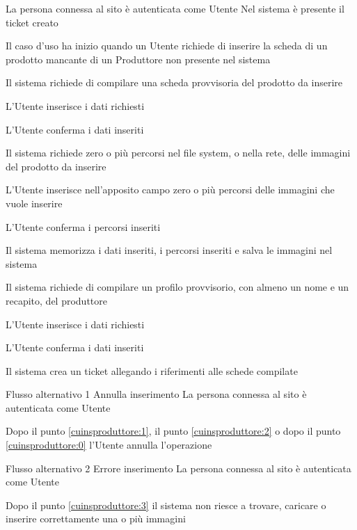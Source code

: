{}
{La persona connessa al sito è autenticata come Utente}
{Nel sistema è presente il ticket creato}
{\begin{enumCU}
		\item Il caso d'uso ha inizio quando un Utente richiede di inserire la scheda di un prodotto mancante di un Produttore non presente nel sistema
		\item Il sistema richiede di compilare una scheda provvisoria del prodotto da inserire
		\item L'Utente inserisce i dati richiesti \label{cuinsproduttore:1}
		\item L'Utente conferma i dati inseriti 
		\item Il sistema richiede zero o più percorsi nel file system, o nella rete, delle immagini del prodotto da inserire
		\item L'Utente inserisce nell'apposito campo zero o più percorsi delle immagini che vuole inserire \label{cuinsproduttore:2}
		\item L'Utente conferma i percorsi inseriti \label{cuinsproduttore:3}
		\item Il sistema memorizza i dati inseriti, i percorsi inseriti e salva le immagini nel sistema
		\item Il sistema richiede di compilare un profilo provvisorio, con almeno un nome e un recapito, del produttore
		\item L'Utente inserisce i dati richiesti \label{cuinsproduttore:0}
		\item L'Utente conferma i dati inseriti
		\item Il sistema crea un ticket allegando i riferimenti alle schede compilate
	\end{enumCU}}
%
{Flusso alternativo 1}%
{Annulla inserimento}%
{La persona connessa al sito è autenticata come Utente}%
{\postNulle}%
{\begin{enumCU}
		\item Dopo il punto \ref{cuinsproduttore:1}, il punto \ref{cuinsproduttore:2} o dopo il punto \ref{cuinsproduttore:0} l'Utente annulla l'operazione
	\end{enumCU}}%
%
{Flusso alternativo 2}%
{Errore inserimento}%
{La persona connessa al sito è autenticata come Utente}%
{\postNulle}%
{\begin{enumCU}
		\item Dopo il punto \ref{cuinsproduttore:3} il sistema non riesce a trovare, caricare o inserire correttamente una o più immagini
	\end{enumCU}}%

